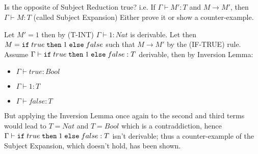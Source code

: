 \subsection{}

Is the opposite of Subject Reduction true? i.e. If $\Gamma \vdash M': T$ and $M \to M'$, then
$\Gamma \vdash M: T$ (called Subject Expansion) Either prove it or show a counter-example.

Let $M' = 1$ then by (T-INT) $\Gamma \vdash 1: Nat$ is derivable.
Let then $M = \texttt{if}\;true\;\texttt{then}\;1\;\texttt{else}\;false$ such that $M \to M'$ by the (IF-TRUE) rule.
Assume $\Gamma \vdash \texttt{if}\;true\;\texttt{then}\;1\;\texttt{else}\;false: T$ derivable, then by Inversion Lemma:
\begin{itemize}
	\item $\Gamma \vdash true: Bool$
	\item $\Gamma \vdash 1: T$
	\item $\Gamma \vdash false: T$
\end{itemize}


But applying the Inversion Lemma once again to the second and third terms would lead to $T = Nat$
and $T = Bool$ which is a contraddiction, hence $\Gamma \vdash \texttt{if}\;true\;\texttt{then}\;1\;\texttt{else}\;false: T$ isn't
derivable; thus a counter-example of the Subject Expansion, which doesn't hold, has been shown.
